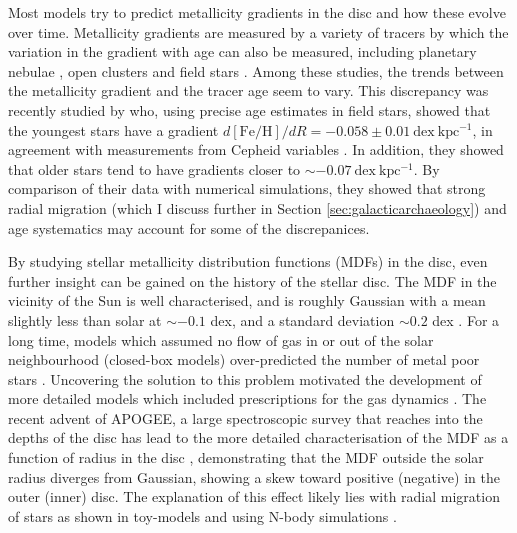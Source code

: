 Most models try to predict metallicity gradients in the disc and how these evolve over time. Metallicity gradients are measured by a variety of tracers by which the variation in the gradient with age can also be measured, including planetary nebulae \citep[e.g.][]{1994A&A...282..436M,1994Ap&SS.219..231M,2010ApJ...714.1096S,2011ApJ...738...27B}, open clusters \citep[e.g.][]{1998MNRAS.296.1045C,2002AJ....124.2693F,2004A&A...414..163S,2009A&A...494...95M,2016AN....337..922C} and field stars \citep[e.g][]{2004A&A...418..989N,2014A&A...566A..37G}. Among these studies, the trends between the metallicity gradient and the tracer age seem to vary. This discrepancy was recently studied by \citet{2016arXiv160804951A} who, using precise age estimates in field stars, showed that the youngest stars have a gradient $d\mathrm{[Fe/H]}/dR = -0.058\pm 0.01\ \mathrm{dex\ kpc^{-1}}$, in agreement with measurements from Cepheid variables \citep{2014A&A...566A..37G}. In addition, they showed that older stars tend to have gradients closer to $\sim -0.07\ \mathrm{dex\ kpc^{-1}}$. By comparison of their data with numerical simulations, they showed that strong radial migration (which I discuss further in Section \ref{sec:galacticarchaeology}) and age systematics may account for some of the discrepanices.

By studying stellar metallicity distribution functions (MDFs) in the disc, even further insight can be gained on the history of the stellar disc. The MDF in the vicinity of the Sun is well characterised, and is roughly Gaussian with a mean \feh{} slightly less than solar at $\sim -0.1$ dex, and a standard deviation $\sim 0.2$ dex  \citep{1962AJ.....67..486V,2004A&A...418..989N,2011A&A...530A.138C,2012ApJ...761..160S}. For a long time, models which assumed no flow of gas in or out of the solar neighbourhood (closed-box models) over-predicted the number of metal poor stars \citep[the G-dwarf problem, e.g.][]{1963ApJ...137..758S,1975MNRAS.172...13P}. Uncovering the solution to this problem motivated the development of more detailed models which included prescriptions for the gas dynamics \citep[e.g.][]{1972Natur.236...21L,1976MNRAS.176...31L,1977ApJ...216..548T,1980FCPh....5..287T,1989MNRAS.239..885M}. The recent advent of APOGEE, a large spectroscopic survey that reaches into the depths of the disc has lead to the more detailed characterisation of the MDF as a function of radius in the disc \citep[e.g.][]{2014A&A...564A.115A,2015ApJ...808..132H}, demonstrating that the MDF outside the solar radius diverges from Gaussian, showing a skew toward positive (negative) \feh{} in the outer (inner) disc. The explanation of this effect likely lies with radial migration of stars as shown in toy-models \citep{2015ApJ...808..132H} and using N-body simulations \citep{2016ApJ...818L...6L}.

